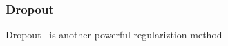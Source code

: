 \subsubsection{Dropout}

Dropout~\cite{JMLR:v15:srivastava14a} is another powerful regulariztion method